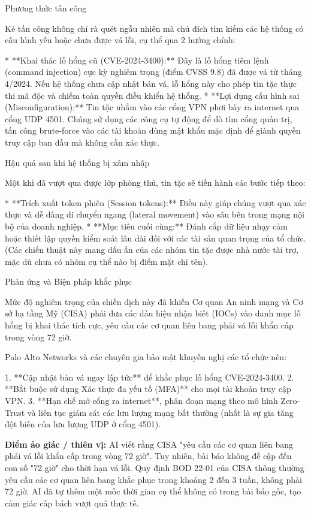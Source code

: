 Phương thức tấn công

Kẻ tấn công không chỉ rà quét ngẫu nhiên mà chủ đích tìm kiếm các hệ thống có cấu hình yếu hoặc chưa được vá lỗi, cụ thể qua 2 hướng chính:

* **Khai thác lỗ hổng cũ (CVE-2024-3400):** Đây là lỗ hổng tiêm lệnh (command injection) cực kỳ nghiêm trọng (điểm CVSS 9.8) đã được vá từ tháng 4/2024. Nếu hệ thống chưa cập nhật bản vá, lỗ hổng này cho phép tin tặc thực thi mã độc và chiếm toàn quyền điều khiển hệ thống.
* **Lợi dụng cấu hình sai (Misconfiguration):** Tin tặc nhắm vào các cổng VPN phơi bày ra internet qua cổng UDP 4501. Chúng sử dụng các công cụ tự động để dò tìm cổng quản trị, tấn công brute-force vào các tài khoản dùng mật khẩu mặc định để giành quyền truy cập ban đầu mà không cần xác thực.

Hậu quả sau khi hệ thống bị xâm nhập

Một khi đã vượt qua được lớp phòng thủ, tin tặc sẽ tiến hành các bước tiếp theo:

* **Trích xuất token phiên (Session tokens):** Điều này giúp chúng vượt qua xác thực và dễ dàng di chuyển ngang (lateral movement) vào sâu bên trong mạng nội bộ của doanh nghiệp.
* **Mục tiêu cuối cùng:** Đánh cắp dữ liệu nhạy cảm hoặc thiết lập quyền kiểm soát lâu dài đối với các tài sản quan trọng của tổ chức. (Các chiến thuật này mang dấu ấn của các nhóm tin tặc được nhà nước tài trợ, mặc dù chưa có nhóm cụ thể nào bị điểm mặt chỉ tên).

Phản ứng và Biện pháp khắc phục

Mức độ nghiêm trọng của chiến dịch này đã khiến Cơ quan An ninh mạng và Cơ sở hạ tầng Mỹ (CISA) phải đưa các dấu hiệu nhận biết (IOCs) vào danh mục lỗ hổng bị khai thác tích cực, yêu cầu các cơ quan liên bang phải vá lỗi khẩn cấp trong vòng 72 giờ.

Palo Alto Networks và các chuyên gia bảo mật khuyến nghị các tổ chức nên:

1. **Cập nhật bản vá ngay lập tức** để khắc phục lỗ hổng CVE-2024-3400.
2. **Bắt buộc sử dụng Xác thực đa yếu tố (MFA)** cho mọi tài khoản truy cập VPN.
3. **Hạn chế mở cổng ra internet**, phân đoạn mạng theo mô hình Zero-Trust và liên tục giám sát các lưu lượng mạng bất thường (nhất là sự gia tăng đột biến của lưu lượng UDP ở cổng 4501).

\textbf{Điểm ảo giác / thiên vị:}
AI viết rằng CISA "yêu cầu các cơ quan liên bang phải vá lỗi khẩn cấp trong vòng 72 giờ". Tuy nhiên, bài báo không đề cập đến con số "72 giờ" cho thời hạn vá lỗi. Quy định BOD 22-01 của CISA thông thường yêu cầu các cơ quan liên bang khắc phục trong khoảng 2 đến 3 tuần, không phải 72 giờ. AI đã tự thêm một mốc thời gian cụ thể không có trong bài báo gốc, tạo cảm giác cấp bách vượt quá thực tế.

